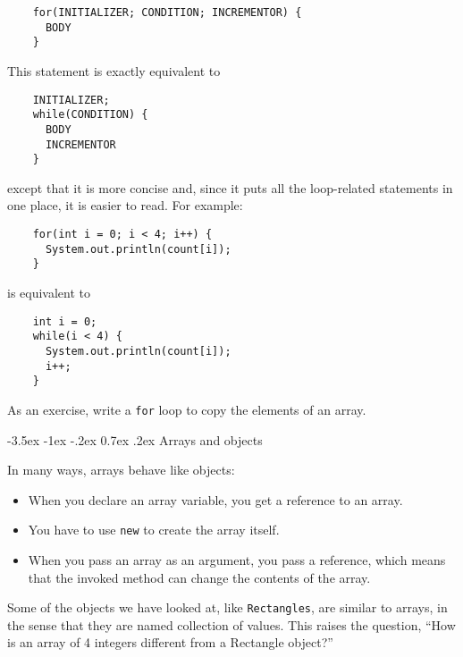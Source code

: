 \documentclass{book}
\makeatletter
\renewcommand{\section}{\@startsection 
    {section} {1} {0mm}%
    {-3.5ex \@plus -1ex \@minus -.2ex}%
    {0.7ex \@plus.2ex}%
    {\normalfont\Large\bfseries}}
\makeatother
\begin{document}
\begin{verbatim}
    for(INITIALIZER; CONDITION; INCREMENTOR) {
      BODY
    }
\end{verbatim}
%
This statement is exactly equivalent to

\begin{verbatim}
    INITIALIZER;
    while(CONDITION) {
      BODY
      INCREMENTOR
    }
\end{verbatim}
%
except that it is more concise and, since it puts all the
loop-related statements in one place, it is easier to read.
For example:

\begin{verbatim}
    for(int i = 0; i < 4; i++) {
      System.out.println(count[i]);
    }
\end{verbatim}
%
is equivalent to 

\begin{verbatim}
    int i = 0;
    while(i < 4) {
      System.out.println(count[i]);
      i++;
    }
\end{verbatim}
%
As an exercise, write a {\tt for} loop to copy the elements
of an array.

\section{Arrays and objects}

In many ways, arrays behave like objects:

\begin{itemize}

\item When you declare an array variable, you get a reference
to an array.

\item You have to use {\tt new} to create the array
itself.

\item When you pass an array as an argument, you pass a reference,
which means that the invoked method can change the contents
of the array.

\end{itemize}

Some of the objects we have looked at, like {\tt Rectangles}, are
similar to arrays, in the sense that they are named collection of
values.  This raises the question, ``How is an array of 4 integers
different from a Rectangle object?''

\end{document}
